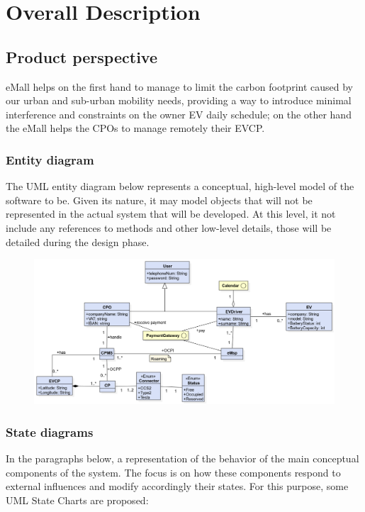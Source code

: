\section{Overall Description}

\subsection{Product perspective}
eMall helps on the first hand to manage to limit the carbon footprint caused by our urban and sub-urban mobility needs,
providing a way to introduce minimal interference and constraints on the owner EV daily schedule;
on the other hand the eMall helps the CPOs to manage remotely their EVCP.
\vspace{1cm}
\subsubsection{Entity diagram}
The UML entity diagram below represents a conceptual, high-level model of
the software to be. Given its nature, it may model objects that will not
be represented in the actual system that will be developed. At this
level, it not include any references to methods and other low-level
details, those will be detailed during the design phase.
\begin{figure}[H]
      \centering
      \includegraphics[scale=0.4]{src/domain_UML.png}
\end{figure} \vspace{1cm}

\subsubsection{State diagrams}
In the paragraphs below, a representation of the behavior of the main conceptual
components of the system. The focus is on how these components respond to
external influences and modify accordingly their states. For this purpose,
some UML State Charts are proposed:

